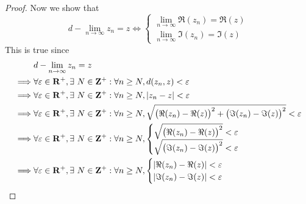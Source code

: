 \begin{proof}
    Now we show that
    \[
        d - \lim_{n \to \infty} z_n = z \iff \begin{cases}
            \lim_{n \to \infty} \Re(z_n) = \Re(z) \\
            \lim_{n \to \infty} \Im(z_n) = \Im(z)
        \end{cases}
    \]
    This is true since
    \begin{align*}
                 & d - \lim_{n \to \infty} z_n = z                                                                                                                          \\
        \implies & \forall \varepsilon \in \R^+, \exists\ N \in \Z^+ : \forall n \geq N, d(z_n, z) < \varepsilon                                                            \\
        \implies & \forall \varepsilon \in \R^+, \exists\ N \in \Z^+ : \forall n \geq N, \abs{z_n - z} < \varepsilon                                                        \\
        \implies & \forall \varepsilon \in \R^+, \exists\ N \in \Z^+ : \forall n \geq N, \sqrt{\big(\Re(z_n) - \Re(z)\big)^2 + \big(\Im(z_n) - \Im(z)\big)^2} < \varepsilon \\
        \implies & \forall \varepsilon \in \R^+, \exists\ N \in \Z^+ : \forall n \geq N, \begin{cases}
                                                                                             \sqrt{\big(\Re(z_n) - \Re(z)\big)^2} < \varepsilon \\
                                                                                             \sqrt{\big(\Im(z_n) - \Im(z)\big)^2} < \varepsilon
                                                                                         \end{cases}                                 \\
        \implies & \forall \varepsilon \in \R^+, \exists\ N \in \Z^+ : \forall n \geq N, \begin{cases}
                                                                                             \abs{\Re(z_n) - \Re(z)} < \varepsilon \\
                                                                                             \abs{\Im(z_n) - \Im(z)} < \varepsilon
                                                                                         \end{cases}                                              \\

\end{align*}
\end{proof}
